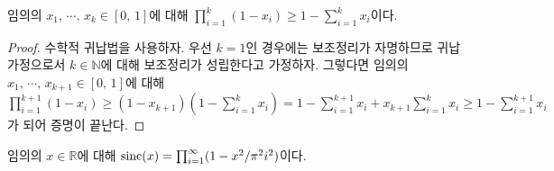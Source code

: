 \begin{lemma}
    임의의 $x_1,\,\cdots,\,x_k\in[0,\,1]$에 대해 $\prod_{i=1}^k(1-x_i)\geq1-\sum_{i=1}^kx_i$이다.
\end{lemma}

\begin{proof}
    수학적 귀납법을 사용하자. 우선 $k=1$인 경우에는 보조정리가 자명하므로 귀납가정으로서 $k\in\mathbb{N}$에 대해 보조정리가 성립한다고 가정하자. 그렇다면 임의의 $x_1,\,\cdots,\,x_{k+1}\in[0,\,1]$에 대해 $\prod_{i=1}^{k+1}(1-x_i)\geq(1-x_{k+1})(1-\sum_{i=1}^kx_i)=1-\sum_{i=1}^{k+1}x_i+x_{k+1}\sum_{i=1}^kx_i\geq1-\sum_{i=1}^{k+1}x_i$가 되어 증명이 끝난다.
\end{proof}

\begin{theorem}
    임의의 $x\in\mathbb{R}$에 대해 $\mathrm{sinc}(x)=\prod_{i=1}^\infty(1-x^2/\pi^2i^2)$이다.\footnotemark
\end{theorem}

